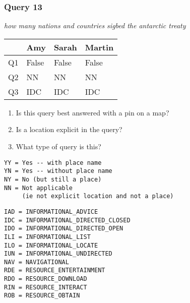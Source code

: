 \begin{frame}[fragile]
\frametitle{Query 13}
\vspace{1em}

\emph{how many nations and countries sigbed the antarctic treaty}

\vfill

\begin{table}
  \centering
  \begin{tabular}{ l l l l }
    & \textbf{Amy} & \textbf{Sarah} & \textbf{Martin}\\
    \toprule
    Q1 & False & False & False\\
Q2 & NN & NN & NN\\
Q3 & IDC & IDC & IDC\\
    \bottomrule
  \end{tabular}
\end{table}

\vfill

\tiny{

\begin{enumerate}
\item Is this query best answered with a pin on a map?
\item Is a location explicit in the query?
\item What type of query is this?
\end{enumerate}

\vfill

\begin{multicols}{2}
\begin{verbatim}
YY = Yes -- with place name
YN = Yes -- without place name
NY = No (but still a place)
NN = Not applicable 
     (ie not explicit location and not a place)
\end{verbatim}

\columnbreak
\begin{verbatim}
IAD = INFORMATIONAL_ADVICE
IDC = INFORMATIONAL_DIRECTED_CLOSED
IDO = INFORMATIONAL_DIRECTED_OPEN
ILI = INFORMATIONAL_LIST
ILO = INFORMATIONAL_LOCATE
IUN = INFORMATIONAL_UNDIRECTED
NAV = NAVIGATIONAL
RDE = RESOURCE_ENTERTAINMENT
RDO = RESOURCE_DOWNLOAD
RIN = RESOURCE_INTERACT
ROB = RESOURCE_OBTAIN
\end{verbatim}
\end{multicols}
}

\end{frame}


